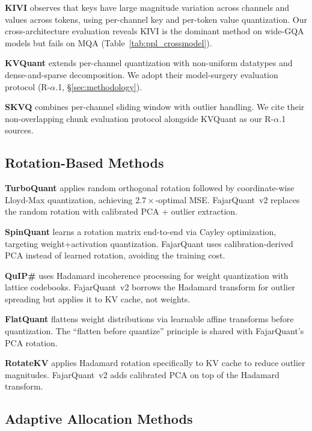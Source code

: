 \documentclass{article}
\begin{document}
\textbf{KIVI} \citep{liu2024kivi} observes that keys have large
magnitude variation across channels and values across tokens, using
per-channel key and per-token value quantization. Our cross-architecture
evaluation reveals KIVI is the dominant method on wide-GQA models but
fails on MQA (Table~\ref{tab:ppl_crossmodel}).

\textbf{KVQuant} \citep{hooper2024kvquant} extends per-channel
quantization with non-uniform datatypes and dense-and-sparse
decomposition. We adopt their model-surgery evaluation protocol
(R-$\alpha$.1, \S\ref{sec:methodology}).

\textbf{SKVQ} \citep{duanmu2024skvq} combines per-channel sliding
window with outlier handling. We cite their non-overlapping chunk
evaluation protocol alongside KVQuant as our R-$\alpha$.1 sources.

\subsection{Rotation-Based Methods}

\textbf{TurboQuant} \citep{zandieh2025turboquant} applies random
orthogonal rotation followed by coordinate-wise Lloyd-Max quantization,
achieving $2.7\times$-optimal MSE. FajarQuant~v2 replaces the random
rotation with calibrated PCA + outlier extraction.

\textbf{SpinQuant} \citep{liu2024spinquant} learns a rotation matrix
end-to-end via Cayley optimization, targeting weight+activation
quantization. FajarQuant uses calibration-derived PCA instead of learned
rotation, avoiding the training cost.

\textbf{QuIP\#} \citep{tseng2024quip} uses Hadamard incoherence
processing for weight quantization with lattice codebooks. FajarQuant~v2
borrows the Hadamard transform for outlier spreading but applies it to
KV cache, not weights.

\textbf{FlatQuant} \citep{sun2024flatquant} flattens weight
distributions via learnable affine transforms before quantization. The
``flatten before quantize'' principle is shared with FajarQuant's PCA
rotation.

\textbf{RotateKV} \citep{wang2024rotatekv} applies Hadamard rotation
specifically to KV cache to reduce outlier magnitudes. FajarQuant~v2
adds calibrated PCA on top of the Hadamard transform.

\subsection{Adaptive Allocation Methods}
\end{document}
